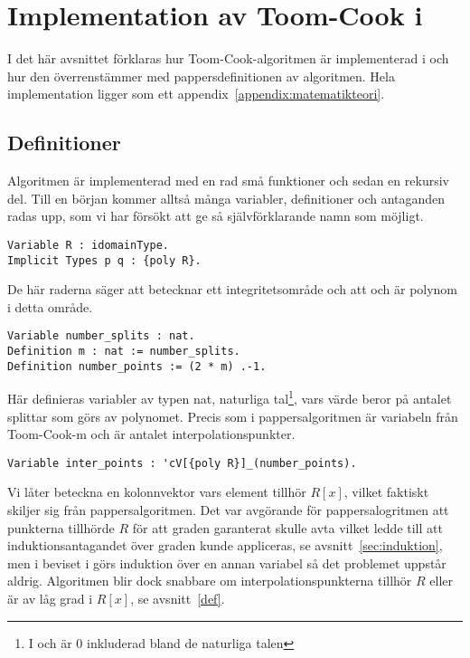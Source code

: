 \section{Implementation av Toom-Cook i \coq{}}
\label{sec:formellimplementation}
I det här avsnittet förklaras hur Toom-Cook-algoritmen är implementerad i \ssr{}
och hur den överrenstämmer med pappersdefinitionen av algoritmen. Hela
implementation ligger som ett appendix~\ref{appendix:matematikteori}.

\subsection{Definitioner}
Algoritmen är implementerad med en rad små funktioner och sedan en rekursiv
del. Till en början kommer alltså många variabler, definitioner och antaganden
radas upp, som vi har försökt att ge så självförklarande namn som möjligt.

\begin{lstlisting}
Variable R : idomainType.
Implicit Types p q : {poly R}.
\end{lstlisting}

De här raderna säger att  betecknar ett integritetsområde och att 
och  är polynom i detta område.

\begin{lstlisting}
Variable number_splits : nat.
Definition m : nat := number_splits.
Definition number_points := (2 * m) .-1.
\end{lstlisting}

Här definieras variabler av typen nat, naturliga tal\footnote{I \coq{} och \ssr{}
är 0 inkluderad bland de naturliga talen}, vars värde beror på antalet splittar
som görs av polynomet. Precis som i pappersalgoritmen är  variabeln från
Toom-Cook-m och  är antalet interpolationspunkter.

\begin{lstlisting}
Variable inter_points : 'cV[{poly R}]_(number_points).
\end{lstlisting}

Vi låter  beteckna en kolonnvektor vars element tillhör $R[x]$,
vilket faktiskt skiljer sig från pappersalgoritmen. Det var avgörande för
pappersalogritmen att punkterna tillhörde $R$ för att graden garanterat skulle
avta vilket ledde till att induktionsantagandet över graden kunde appliceras,
se avsnitt~\ref{sec:induktion}, men i beviset i\ssr{} görs induktion över en annan
variabel så det problemet uppstår aldrig. Algoritmen blir dock snabbare om
interpolationspunkterna tillhör $R$ eller är av låg grad i $R[x]$, se
avsnitt~\ref{def}.

